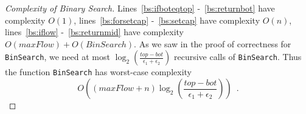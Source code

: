 \begin{proof}[Complexity of Binary Search]
  Lines~\ref{bs:ifboteqtop} -~\ref{bs:returnbot} have complexity $O\left(1\right)$, lines~\ref{bs:forsetcap}
  -~\ref{bs:setcap} have complexity $O\left(n\right)$, lines~\ref{bs:iflow} -~\ref{bs:returnmid} have complexity
  $O\left(maxFlow\right) + O\left(BinSearch\right)$. As we saw in the proof of correctness for \texttt{BinSearch}, we need
  at most $\log_2\left(\frac{top - bot}{\epsilon_1 + \epsilon_2}\right)$ recursive calls of \texttt{BinSearch}. Thus the
  function \texttt{BinSearch} has worst-case complexity
  \begin{equation*}
    O\left(\left(maxFlow + n\right)\log_2\left(\frac{top - bot}{\epsilon_1 + \epsilon_2}\right)\right) \enspace.
  \end{equation*}
\end{proof}
